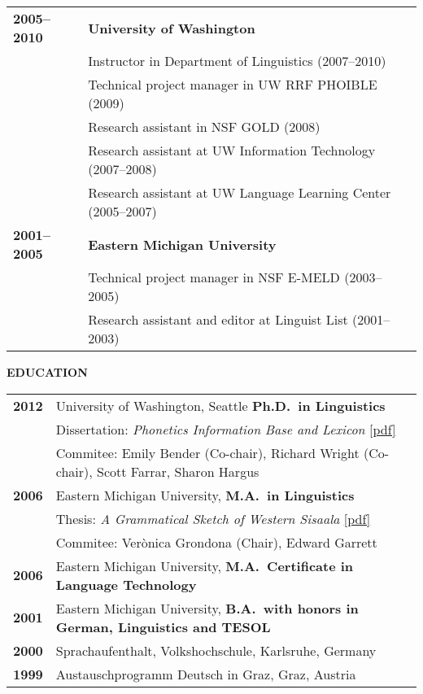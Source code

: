 \documentclass[11pt]{article}
\begin{document}
\begin{tabular}{lp{5.5in}}
\bf 2005--2010 & {\bf University of Washington} \\
& Instructor in Department of Linguistics (2007--2010) \\
& Technical project manager in UW RRF PHOIBLE (2009) \\
& Research assistant in NSF GOLD (2008) \\
& Research assistant at UW Information Technology (2007--2008) \\ %
& Research assistant at UW Language Learning Center (2005--2007) \\

\bf 2001--2005 & {\bf Eastern Michigan University} \\ 
& Technical project manager in NSF E-MELD (2003--2005) \\
& Research assistant and editor at Linguist List (2001--2003) \\
\end{tabular}

\vskip 12pt
\begin{flushleft}
{\bf EDUCATION}
\end{flushleft}
\begin{tabular}{ll}
\bf 2012 & University of Washington, Seattle \textbf{Ph.D.\ in Linguistics} \\
& Dissertation: \textit{Phonetics Information Base and Lexicon} \href{https://digital.lib.washington.edu/researchworks/handle/1773/22452}{[pdf]} \\
& Commitee: Emily Bender (Co-chair), Richard Wright (Co-chair), Scott Farrar, Sharon Hargus \\
\bf 2006 & Eastern Michigan University, \textbf{M.A.\ in Linguistics}  \\
& Thesis: {\it A Grammatical Sketch of Western Sisaala} \href{http://commons.emich.edu/theses/73/}{[pdf]}\\
& Commitee: Verònica Grondona (Chair), Edward Garrett \\
\bf 2006 & Eastern Michigan University, \textbf{M.A.\ Certificate in Language Technology}  \\
\bf 2001 & Eastern Michigan University, \textbf{B.A.\ with honors in German, Linguistics and TESOL}  \\
\bf 2000 & Sprachaufenthalt, Volkshochschule, Karlsruhe, Germany \\
\bf 1999 & Austauschprogramm Deutsch in Graz, Graz, Austria \\
\end{tabular}
\end{document}
